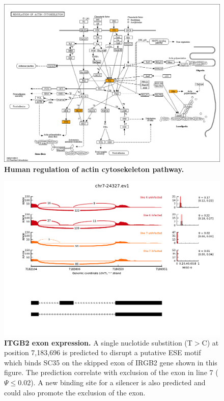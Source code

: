 \documentclass[10pt]{article}
\begin{document}
\begin{figure}[!ht]
    \begin{center}
        \includegraphics[width=6in]{hsa04810_deu_genes.png}
    \end{center}
    \caption{
        {\bf Human regulation of actin cytosekeleton pathway.}
    }
    \label{kegg_actin}
\end{figure}

\begin{figure}[!ht]
    \begin{center}
        \includegraphics[width=6in]{itgb2_miso.pdf}
    \end{center}
    \caption{
        {\bf ITGB2 exon expression.}
        A single nuclotide substition (T$>$C) at position 7,183,696 is predicted to disrupt a putative ESE
        motif which binds SC35 on the skipped exon of IRGB2 gene shown in this figure.
        The prediction correlate with exclusion of the exon in line 7 ($\Psi \leq 0.02$).
        A new binding site for a silencer is also predicted and could also promote the exclusion of the exon. 
    }
    \label{itgb2}
\end{figure}
\end{document}
